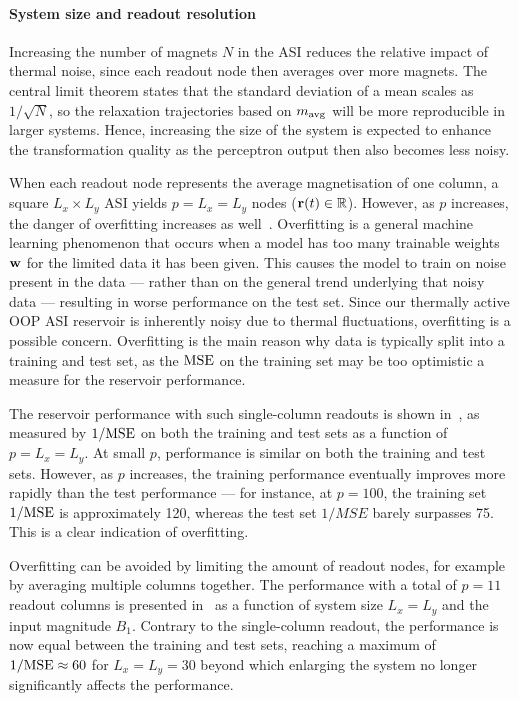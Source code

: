 \paragraph{System size and readout resolution}
Increasing the number of magnets $N$ in the ASI reduces the relative impact of thermal noise, since each readout node then averages over more magnets.
The central limit theorem states that the standard deviation of a mean scales as $1/\sqrt{N}$, so the relaxation trajectories based on $m_\mathrm{avg}$ will be more reproducible in larger systems.
Hence, increasing the size of the system is expected to enhance the transformation quality as the perceptron output then also becomes less noisy. \par
When each readout node represents the average magnetisation of one column, a square $L_x \times L_y$ ASI yields $p = L_x = L_y$ nodes ($\boldsymbol{\mathbf{r}}(t) \in \mathbb{R}$).
However, as $p$ increases, the danger of overfitting increases as well~\cite{DeepRC_IonGating_Overfitting,lukovsevivcius2009reservoir}.
Overfitting is a general machine learning phenomenon that occurs when a model has too many trainable weights $\boldsymbol{\mathbf{w}}$ for the limited data it has been given.
This causes the model to train on noise present in the data --- rather than on the general trend underlying that noisy data --- resulting in worse performance on the test set.
Since our thermally active OOP ASI reservoir is inherently noisy due to thermal fluctuations, overfitting is a possible concern.
Overfitting is the main reason why data is typically split into a training and test set, as the $\mathrm{MSE}$ on the training set may be too optimistic a measure for the reservoir performance. \par
The reservoir performance with such single-column readouts is shown in~, as measured by $1/\mathrm{MSE}$ on both the training and test sets as a function of $p=L_x=L_y$.
At small $p$, performance is similar on both the training and test sets.
However, as $p$ increases, the training performance eventually improves more rapidly than the test performance --- for instance, at $p=100$, the training set $1/\mathrm{MSE}$ is approximately 120, whereas the test set $1/MSE$ barely surpasses 75.
This is a clear indication of overfitting. \par
Overfitting can be avoided by limiting the amount of readout nodes, for example by averaging multiple columns together.
The performance with a total of $p=11$ readout columns is presented in~ as a function of system size $L_x = L_y$ and the input magnitude $B_1$.
Contrary to the single-column readout, the performance is now equal between the training and test sets, reaching a maximum of $1/\mathrm{MSE} \approx 60$ for $L_x=L_y=30$ beyond which enlarging the system no longer significantly affects the performance.

